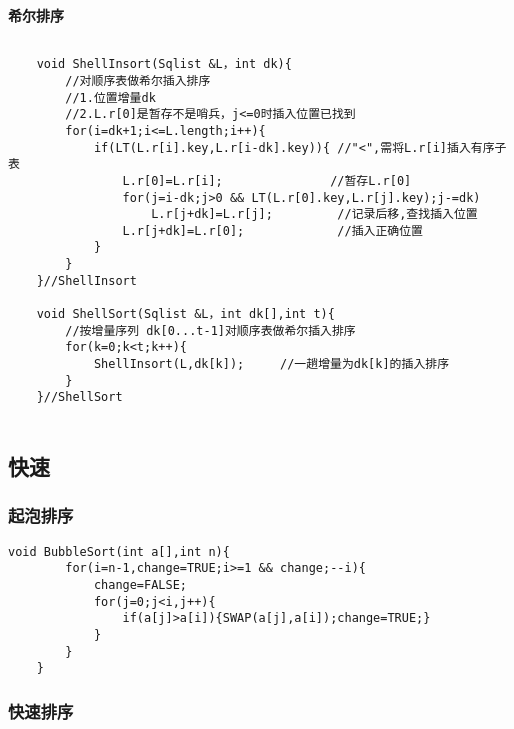 \documentclass[UTF8]{ctexart}
\newcommand{\mb}[1]{\textbf{#1}}
\begin{document}
\newpage
\mb{希尔排序}

\begin{lstlisting}[style=v1]

    void ShellInsort(Sqlist &L，int dk){
        //对顺序表做希尔插入排序
        //1.位置增量dk
        //2.L.r[0]是暂存不是哨兵，j<=0时插入位置已找到
        for(i=dk+1;i<=L.length;i++){
            if(LT(L.r[i].key,L.r[i-dk].key)){ //"<",需将L.r[i]插入有序子表
                L.r[0]=L.r[i];               //暂存L.r[0]
                for(j=i-dk;j>0 && LT(L.r[0].key,L.r[j].key);j-=dk)
                    L.r[j+dk]=L.r[j];         //记录后移,查找插入位置
                L.r[j+dk]=L.r[0];             //插入正确位置
            }
        }
    }//ShellInsort

    void ShellSort(Sqlist &L，int dk[],int t){
        //按增量序列 dk[0...t-1]对顺序表做希尔插入排序
        for(k=0;k<t;k++){
            ShellInsort(L,dk[k]);     //一趟增量为dk[k]的插入排序
        }
    }//ShellSort


\end{lstlisting}

 

\subsection{快速}
\subsubsection{起泡排序}

\begin{lstlisting}[style=v1]
    void BubbleSort(int a[],int n){
        for(i=n-1,change=TRUE;i>=1 && change;--i){
            change=FALSE;
            for(j=0;j<i,j++){
                if(a[j]>a[i]){SWAP(a[j],a[i]);change=TRUE;}
            }
        }
    }
\end{lstlisting}



\subsubsection{快速排序}
 
\end{document}
